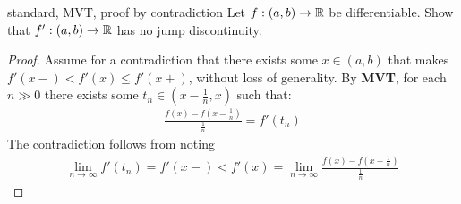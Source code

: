 \documentclass{report}
\begin{document}
\begin{question}{standard, MVT, proof by contradiction}{}
Let $f:(a,b)\rightarrow \mathbb{R}$ be differentiable. Show that $f':(a,b)\rightarrow \mathbb{R}$ has no jump discontinuity. 
\end{question}
\begin{proof}
Assume for a contradiction that there exists some $x \in (a,b)$ that makes $f'(x-)< f'(x) \leq f'(x+) $, without loss of generality. By \textbf{MVT}, for each $n\gg  0$ there exists some $t_n \in (x- \frac{1}{n} ,x)$ such that: 
\begin{align*}
\frac{f(x)-f(x- \frac{1}{n} )}{\frac{1}{n} } = f'(t_n)
\end{align*}
The contradiction follows from noting  
\begin{align*}
\lim_{n\to \infty} f'(t_n) =f'(x-)<f'(x)=\lim_{n\to \infty} \frac{f(x)-f(x- \frac{1}{n})}{\frac{1}{n}} 
\end{align*}
\end{proof}
\end{document}
